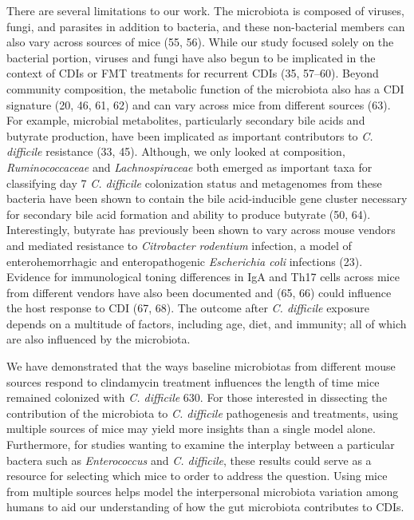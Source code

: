\documentclass[
  11pt,
]{article}
\begin{document}
There are several limitations to our work. The microbiota is composed of
viruses, fungi, and parasites in addition to bacteria, and these
non-bacterial members can also vary across sources of mice (55, 56).
While our study focused solely on the bacterial portion, viruses and
fungi have also begun to be implicated in the context of CDIs or FMT
treatments for recurrent CDIs (35, 57--60). Beyond community
composition, the metabolic function of the microbiota also has a CDI
signature (20, 46, 61, 62) and can vary across mice from different
sources (63). For example, microbial metabolites, particularly secondary
bile acids and butyrate production, have been implicated as important
contributors to \emph{C. difficile} resistance (33, 45). Although, we
only looked at composition, \emph{Ruminococcaceae} and
\emph{Lachnospiraceae} both emerged as important taxa for classifying
day 7 \emph{C. difficile} colonization status and metagenomes from these
bacteria have been shown to contain the bile acid-inducible gene cluster
necessary for secondary bile acid formation and ability to produce
butyrate (50, 64). Interestingly, butyrate has previously been shown to
vary across mouse vendors and mediated resistance to \emph{Citrobacter
rodentium} infection, a model of enterohemorrhagic and enteropathogenic
\emph{Escherichia coli} infections (23). Evidence for immunological
toning differences in IgA and Th17 cells across mice from different
vendors have also been documented and (65, 66) could influence the host
response to CDI (67, 68). The outcome after \emph{C. difficile} exposure
depends on a multitude of factors, including age, diet, and immunity;
all of which are also influenced by the microbiota.

We have demonstrated that the ways baseline microbiotas from different
mouse sources respond to clindamycin treatment influences the length of
time mice remained colonized with \emph{C. difficile} 630. For those
interested in dissecting the contribution of the microbiota to \emph{C.
difficile} pathogenesis and treatments, using multiple sources of mice
may yield more insights than a single model alone. Furthermore, for
studies wanting to examine the interplay between a particular bactera
such as \emph{Enterococcus} and \emph{C. difficile}, these results could
serve as a resource for selecting which mice to order to address the
question. Using mice from multiple sources helps model the interpersonal
microbiota variation among humans to aid our understanding of how the
gut microbiota contributes to CDIs.
\end{document}
